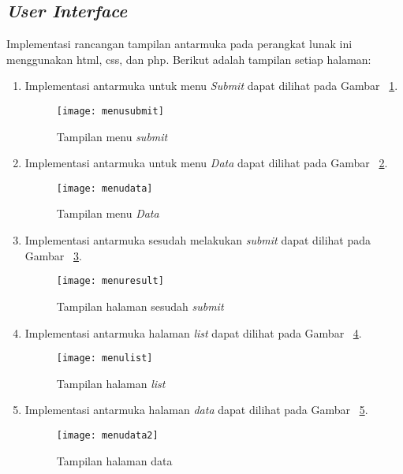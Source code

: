 \subsection{\textit{User Interface}}

Implementasi rancangan tampilan antarmuka pada perangkat lunak ini menggunakan html, css, dan php. Berikut adalah tampilan setiap halaman:

\begin{enumerate}
\item Implementasi antarmuka untuk menu \textit{Submit} dapat dilihat pada Gambar ~\ref{fig:menusubmit}.

\begin{figure}[H]
    \centering  
    \texttt{[image: menusubmit]}  
    \caption[Tampilan menu \textit{Submit}]{Tampilan menu \textit{submit}} 
    \label{fig:menusubmit} 
\end{figure}

\item Implementasi antarmuka untuk menu \textit{Data} dapat dilihat pada Gambar ~\ref{fig:menudata}.

\begin{figure}[H]
    \centering  
    \texttt{[image: menudata]}  
    \caption[Tampilan menu \textit{Data}]{Tampilan menu \textit{Data}} 
    \label{fig:menudata} 
\end{figure}

\item Implementasi antarmuka sesudah melakukan \textit{submit} dapat dilihat pada Gambar ~\ref{fig:menuresult}.

\begin{figure}[H]
    \centering  
    \texttt{[image: menuresult]}  
    \caption[Tampilan halaman sesudah \textit{submit}]{Tampilan halaman sesudah \textit{submit}} 
    \label{fig:menuresult} 
\end{figure}

\item Implementasi antarmuka  halaman \textit{list} dapat dilihat pada Gambar ~\ref{fig:menulist}.

\begin{figure}[H]
    \centering  
    \texttt{[image: menulist]}  
    \caption[Tampilan halaman \textit{list}]{Tampilan halaman \textit{list}} 
    \label{fig:menulist} 
\end{figure}

\item Implementasi antarmuka  halaman \textit{data} dapat dilihat pada Gambar ~\ref{fig:menudata2}.

\begin{figure}[H]
    \centering  
    \texttt{[image: menudata2]}  
    \caption[Tampilan halaman data]{Tampilan halaman data} 
    \label{fig:menudata2} 
\end{figure}

\end{enumerate}

